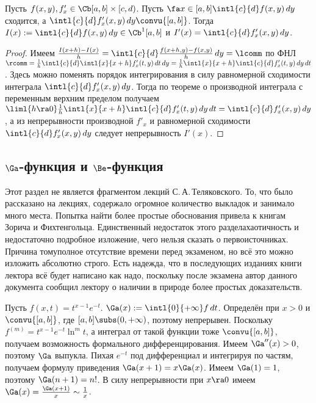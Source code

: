 \documentclass[a4paper]{article}
\newcommand{\intloi}{\intl{0}{+\infty}}
\begin{document}
\begin{theorem}
Пусть $f(x,y), f'_x \in\Cb[a,b]\times[c,d)$. Пусть $\fa x \in [a,b] \intl{c}{d}f(x,y)\,d y$
сходится, а $\intl{c}{d}f'_x(x,y)\,d y\convu{[a,b]}$. Тогда $I(x) := \intl{c}{d}f(x,y)\,d y
\in\Cb^1[a,b]$ и $I'(x)=\intl{c}{d}f'_x(x,y)\,d y$.
\end{theorem}
\begin{proof}
Имеем $\frac{I(x+h)-I(x)}{h}=\intl{c}{d}\frac{f(x+h,y)-f(x,y)}{h}\,d y = \lcomm$ по ФНЛ $\rcomm =
\frac{1}{h}\intl{c}{d}\intl{x}{x+h}f'_x(t,y)\,d t\,d y =
\frac{1}{h}\intl{x}{x+h}\intl{c}{d}f'_x(t,y)\,d y\,d t$. Здесь можно поменять порядок
интегрирования в силу равномерной сходимости интеграла $\intl{c}{d}f'_x(x,y)\,d y$. Тогда по
теореме о производной интеграла с переменным верхним пределом получаем
$\liml{h\ra0}\frac{1}{h}\intl{x}{x+h}\intl{c}{d}f'_x(t,y)\,d y\,d t = \intl{c}{d}f'_x(x,y)\,d
y$, а из непрерывности производной $f'_x$ и равномерной сходимости $\intl{c}{d}f'_x(x,y)\,d y$
следует непрерывность $I'(x)$.
\end{proof}

\subsection{$\Ga$-функция и $\Be$-функция}
\begin{note}
Этот раздел не является фрагментом лекций С.\,А.\,Теляковского. То, что было рассказано на лекциях,
содержало огромное количество выкладок и занимало много места. Попытка найти более простые обоснования
привела к книгам Зорича и Фихтенгольца. Единственный недостаток этого раздела\т хаотичность и недостаточно
подробное изложение, чего нельзя сказать о первоисточниках. Причина тому\т полное отсутствие времени
перед экзаменом, но всё это можно изложить абсолютно строго. Есть надежда,
что в последующих изданиях книги лектора всё будет написано как надо, поскольку после экзамена
автор данного документа сообщил лектору о наличии в природе более простых доказательств.
\end{note}

Пусть $f(x,t)=t^{x-1}e^{-t}$. $\Ga(x) := \intloi f \,d t$. Определён при $x>0$ и $\convu{[a,b]}$,
где $[a,b] \subs (0,+\infty)$, поэтому непрерывен. Поскольку $f^{(m)} = t^{x-1}e^{-t}\ln^m t$, а
интеграл от такой функции тоже $\convu{[a,b]}$, получаем возможность формального дифференцирования.
Имеем $\Ga''(x) > 0$, поэтому $\Ga$ выпукла. Пихая $e^{-t}$ под дифференциал и интегрируя по
частям, получаем формулу приведения $\Ga(x+1)=x\Ga(x)$. Имеем $\Ga(1)=1$, поэтому $\Ga(n+1) = n!$.
В силу непрерывности при $x\ra 0$ имеем $\Ga(x)=\frac{\Ga(x+1)}{x}\sim \frac{1}{x}$.
\end{document}
